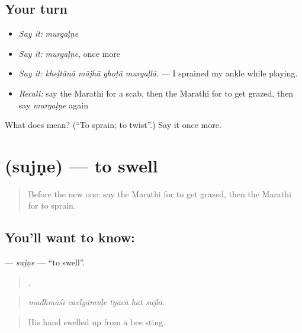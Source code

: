 \subsection*{Your turn}
\begin{itemize}
\raggedright
  \item \emph{Say it:} \emph{murgaḷṇe}
  \item \emph{Say it:} \emph{murgaḷṇe}, once more
  \item \emph{Say it:} \emph{kheḷtānā mājhā ghoṭā murgaḷlā.} — I sprained my ankle while playing.
  \item \emph{Recall:} say the Marathi for a scab, then the Marathi for to get grazed, then say \emph{murgaḷṇe} again
\end{itemize}

\begin{tcolorbox}[breakable,colback=teal!4,colframe=teal!35!black,title={Before you move on}]
What does  mean? (\textquotedblleft{}To sprain; to twist\textquotedblright{}.) Say it once more.
\end{tcolorbox}
\section[\texorpdfstring{\mr{सुजणे} (sujṇe)}{सुजणे (sujṇe)}]{ (sujṇe) — to swell}

\label{lesson:MR-C486-sujne}



\begin{quote}
Before the new one: say the Marathi for to get grazed, then the Marathi for to sprain.
\end{quote}

\subsection*{You'll want to know: }
\textbf{} — \emph{sujṇe} — \textquotedblleft{}to swell\textquotedblright{}.

\begin{quote}
    .
\end{quote}

\begin{quote}
\emph{madhmāśī cāvlyāmuḷe tyācā hāt sujlā.}
\end{quote}

\begin{quote}
His hand swelled up from a bee sting.
\end{quote}

